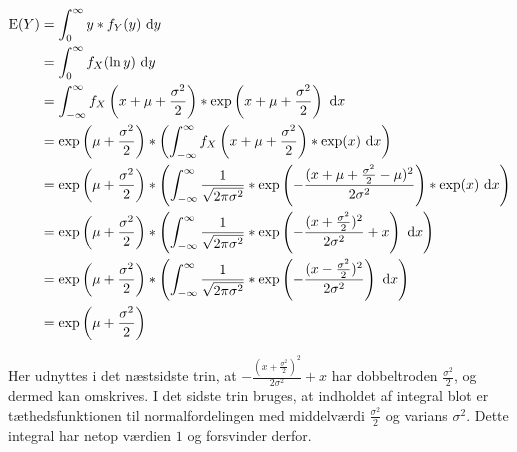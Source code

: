 \begin{align*}
\mathrm{E}(Y)
&= \int_0^\infty y*f_Y(y)\ \mathrm{d} y \\
&= \int_0^\infty f_X(\ln y)\ \mathrm{d} y \\
&= \int_{-\infty}^\infty
     f_X\left(x + \mu + \frac{\sigma^2}{2}\right) *
     \exp\left(x + \mu + \frac{\sigma^2}{2}\right)
   \ \mathrm{d} x \\
&= \exp\left(\mu + \frac{\sigma^2}{2}\right) * \left(\int_{-\infty}^\infty
     f_X\left(x + \mu + \frac{\sigma^2}{2}\right) *
     \exp(x)
   \ \mathrm{d} x\right) \\
&= \exp\left(\mu + \frac{\sigma^2}{2}\right) * \left(\int_{-\infty}^\infty
     \frac{1}{\sqrt{2\pi\sigma^2}} *
     \exp\left(-\frac{(x + \mu + \frac{\sigma^2}{2} - \mu)^2}{2\sigma^2}\right) *
     \exp(x)
   \ \mathrm{d} x\right) \\
&= \exp\left(\mu + \frac{\sigma^2}{2}\right) * \left(\int_{-\infty}^\infty
     \frac{1}{\sqrt{2\pi\sigma^2}} *
     \exp\left(-\frac{(x + \frac{\sigma^2}{2})^2}{2\sigma^2} + x\right)
   \ \mathrm{d} x\right) \\
&= \exp\left(\mu + \frac{\sigma^2}{2}\right) * \left(\int_{-\infty}^\infty
     \frac{1}{\sqrt{2\pi\sigma^2}} *
     \exp\left(-\frac{(x - \frac{\sigma^2}{2})^2}{2\sigma^2}\right)
   \ \mathrm{d} x\right) \\
&= \exp\left(\mu + \frac{\sigma^2}{2}\right) \\
\end{align*}

Her udnyttes i det næstsidste trin, at $-\frac{(x +
\frac{\sigma^2}{2})^2}{2\sigma^2} + x$ har dobbeltroden $\frac{\sigma^2}{2}$, og
dermed kan omskrives. I det sidste trin bruges, at indholdet af integral blot er
tæthedsfunktionen til normalfordelingen med middelværdi $\frac{\sigma^2}{2}$
og varians $\sigma^2$. Dette integral har netop værdien $1$ og forsvinder
derfor.


